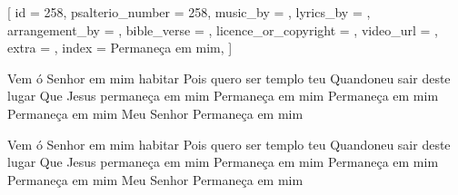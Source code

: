
[
    id                     = {258},
    psalterio_number       = {258},
    music_by               = {},
    lyrics_by              = {},
    arrangement_by         = {},
    bible_verse            = {},
    licence_or_copyright   = {},
    video_url              = {},
    extra                  = {},
    index                  = {Permaneça em mim},
]


\beginverse

Vem ó Senhor em mim habitar
Pois quero ser templo teu
Quandoneu sair deste lugar
Que Jesus permaneça em mim
Permaneça em mim
Permaneça em mim
Permaneça em mim
Meu Senhor
Permaneça em mim

\endverse


\beginverse

Vem ó Senhor em mim habitar
Pois quero ser templo teu
Quandoneu sair deste lugar
Que Jesus permaneça em mim
Permaneça em mim
Permaneça em mim
Permaneça em mim
Meu Senhor
Permaneça em mim

\endverse


\endsong
